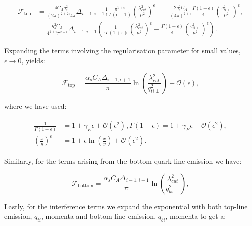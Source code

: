 		\begin{align}
			\mathcal{F}_{\text{top}} &= \frac{4C_Ag_s^2}{(2\pi)^{2+2\epsilon}4\pi}\Delta_{i-1, i+1}\frac{1}{\epsilon}\frac{\pi^{1+\epsilon}}
			{\Gamma(\epsilon+1)}\left(\frac{\lambda_{cut}^2}{\mu^2}\right)^\epsilon - -\frac{2g_s^2C_A}{(4\pi)^{2+\epsilon}}
			\frac{\Gamma(1-\epsilon)}{\epsilon}\left(\frac{q_{ti\perp}^2}{\mu^2}\right)^\epsilon, \\
			&= \frac{g_s^2C_A}{4^{1+\epsilon}\pi^{2+\epsilon}}\Delta_{i-1, i+1}\left(\frac{1}{\epsilon\Gamma(1+\epsilon)}
			\left(\frac{\lambda_{cut}^2}{\mu^2}\right)^\epsilon - \frac{\Gamma(1-\epsilon)}{\epsilon}
			\left(\frac{q_{ti\perp}^2}{\mu^2}\right)^\epsilon\right).
		\end{align}

		Expanding the terms involving the regularisation parameter for small values,
		$\epsilon\to0$, yields:

		\begin{equation}
			\mathcal{F}_{\text{top}} = \frac{\alpha_sC_A\Delta_{i-1, i+1}}{\pi}
			\ln\left(\frac{\lambda_{cut}^2}{q_{ti\perp}^2}\right) + \mathcal{O}(\epsilon),
		\end{equation}

		where we have used:

		\begin{align}
		\begin{split}
			\frac{1}{\Gamma(1+\epsilon)} &= 1 + \gamma_E\epsilon + \mathcal{O}(\epsilon^2),
			\Gamma(1-\epsilon) = 1 + \gamma_E\epsilon + \mathcal{O}(\epsilon^2),\\
			\left(\frac{x}{y}\right)^\epsilon &= 1 + \epsilon\ln\left(\frac{x}{y}\right) +
			\mathcal{O}(\epsilon^2).
		\end{split}
		\end{align}

		Similarly, for the terms arising from the bottom quark-line emission we have:

		\begin{equation}
		\mathcal{F}_{\text{bottom}} = \frac{\alpha_sC_A\Delta_{i-1, i+1}}{\pi}\ln\left(\frac{\lambda_{cut}^2}{q_{bi\perp}^2}\right),
		\end{equation}

		Lastly, for the interference terms we expand the exponential with both top-line emission, $q_{ti}$,
		momenta and bottom-line emission, $q_{bi}$, momenta to get a:


